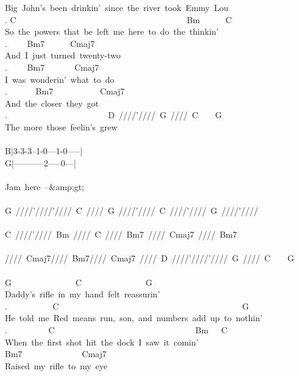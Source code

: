 {Big\ John's\ been\ drinkin'\ since\ the\ river\ took\ Emmy\ Lou\\
. C\ \ \ \ \ \ \ \ \ \ \ \ \ \ \ \ \ \ \ \ \ \ \ \ \ \ \ \ \ \ \ \ \ \ \ \ \ \ \ \ Bm\ \ \ \ \ \ C\\
So\ the\ powers\ that\ be\ left\ me\ here\ to\ do\ the\ thinkin'\\
. \ \ \ \ Bm7\ \ \ \ \ \ Cmaj7\\
And\ I\ just\ turned\ twenty-two\\
. \ \ \ \ Bm7\ \ \ \ \ \ \ Cmaj7\\
I\ was\ wonderin'\ what\ to\ do\\
. \ \ \ \ \ \ Bm7\ \ \ \ \ \ \ \ \ \ \ Cmaj7\\
And\ the\ closer\ they\ got\\
. \ \ \ \ \ \ \ \ \ \ \ \ \ \ \ \ \ \ \ \ \ \ \ D\ ////'////\ G\ ////\ C\ \ \ \ G\\
The\ more\ those\ feelin's\ grew\\
\\
B|3-3-3--1-0---1-0-----|\\
G|-----------2-----0---|\\
\\
Jam\ here\ --\&amp;gt;\\
\\
G\ ////'////'////\ C\ ////\ G\ ////'////\ C\ ////'////\ G\ ////'////\\
\\
C\ ////'////\ Bm\ ////\ C\ ////\ Bm7\ ////\ Cmaj7\ ////\ Bm7\\
\\
////\ Cmaj7////\ Bm7////\ Cmaj7\ ////\ D\ ////'////'////\ G\ ////\ C\ \ \ \ G\\
\\
G\ \ \ \ \ \ \ \ \ \ \ \ \ \ \ C\ \ \ \ \ \ \ \ \ \ \ \ \ \ \ G\\
Daddy's\ rifle\ in\ my\ hand\ felt\ reassurin'\\
. \ \ \ \ \ \ \ \ \ \ C\ \ \ \ \ \ \ \ \ \ \ \ \ \ \ \ \ \ \ \ \ \ \ \ \ \ \ \ \ \ \ \ \ \ \ \ \ \ \ \ \ \ \ G\\
He\ told\ me\ \;Red\ means\ run,\ son,\ and\ numbers\ add\ up\ to\ nothin'\;\\
. \ \ \ \ \ \ \ \ \ C\ \ \ \ \ \ \ \ \ \ \ \ \ \ \ \ \ \ \ \ \ \ \ \ \ \ \ \ \ \ \ \ \ Bm\ \ \ C\\
When\ the\ first\ shot\ hit\ the\ dock\ I\ saw\ it\ comin'\\
Bm7\ \ \ \ \ \ \ \ \ \ \ \ \ \ Cmaj7\\
Raised\ my\ rifle\ to\ my\ eye\\
}
